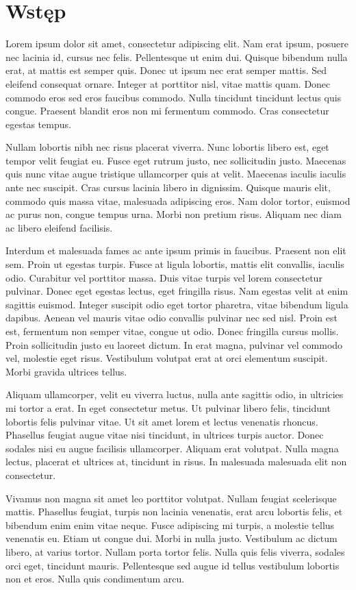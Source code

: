 \chapter*{Wstęp}
		
	Lorem ipsum dolor sit amet, consectetur adipiscing elit. Nam erat ipsum, posuere nec lacinia id, cursus nec felis. Pellentesque ut enim dui. Quisque bibendum nulla erat, at mattis est semper quis. Donec ut ipsum nec erat semper mattis. Sed eleifend consequat ornare. Integer at porttitor nisl, vitae mattis quam. Donec commodo eros sed eros faucibus commodo. Nulla tincidunt tincidunt lectus quis congue. Praesent blandit eros non mi fermentum commodo. Cras consectetur egestas tempus.
	
	Nullam lobortis nibh nec risus placerat viverra. Nunc lobortis libero est, eget tempor velit feugiat eu. Fusce eget rutrum justo, nec sollicitudin justo. Maecenas quis nunc vitae augue tristique ullamcorper quis at velit. Maecenas iaculis iaculis ante nec suscipit. Cras cursus lacinia libero in dignissim. Quisque mauris elit, commodo quis massa vitae, malesuada adipiscing eros. Nam dolor tortor, euismod ac purus non, congue tempus urna. Morbi non pretium risus. Aliquam nec diam ac libero eleifend facilisis.
	
	Interdum et malesuada fames ac ante ipsum primis in faucibus. Praesent non elit sem. Proin ut egestas turpis. Fusce at ligula lobortis, mattis elit convallis, iaculis odio. Curabitur vel porttitor massa. Duis vitae turpis vel lorem consectetur pulvinar. Donec eget egestas lectus, eget fringilla risus. Nam egestas velit at enim sagittis euismod. Integer suscipit odio eget tortor pharetra, vitae bibendum ligula dapibus. Aenean vel mauris vitae odio convallis pulvinar nec sed nisl. Proin est est, fermentum non semper vitae, congue ut odio. Donec fringilla cursus mollis. Proin sollicitudin justo eu laoreet dictum. In erat magna, pulvinar vel commodo vel, molestie eget risus. Vestibulum volutpat erat at orci elementum suscipit. Morbi gravida ultrices tellus.
	
	Aliquam ullamcorper, velit eu viverra luctus, nulla ante sagittis odio, in ultricies mi tortor a erat. In eget consectetur metus. Ut pulvinar libero felis, tincidunt lobortis felis pulvinar vitae. Ut sit amet lorem et lectus venenatis rhoncus. Phasellus feugiat augue vitae nisi tincidunt, in ultrices turpis auctor. Donec sodales nisi eu augue facilisis ullamcorper. Aliquam erat volutpat. Nulla magna lectus, placerat et ultrices at, tincidunt in risus. In malesuada malesuada elit non consectetur.
	
	Vivamus non magna sit amet leo porttitor volutpat. Nullam feugiat scelerisque mattis. Phasellus feugiat, turpis non lacinia venenatis, erat arcu lobortis felis, et bibendum enim enim vitae neque. Fusce adipiscing mi turpis, a molestie tellus venenatis eu. Etiam ut congue dui. Morbi in nulla justo. Vestibulum ac dictum libero, at varius tortor. Nullam porta tortor felis. Nulla quis felis viverra, sodales orci eget, tincidunt mauris. Pellentesque sed augue id tellus vestibulum lobortis non et eros. Nulla quis condimentum arcu.